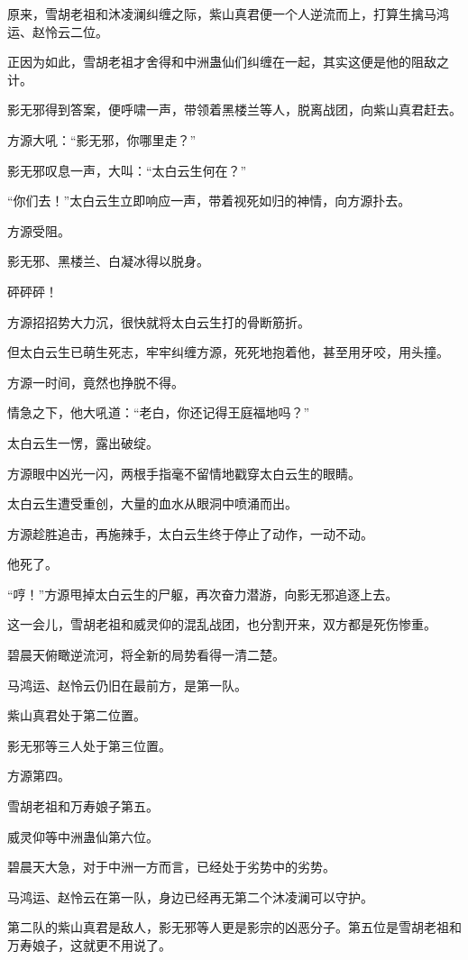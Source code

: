 \begin{this_body}
原来，雪胡老祖和沐凌澜纠缠之际，紫山真君便一个人逆流而上，打算生擒马鸿运、赵怜云二位。

正因为如此，雪胡老祖才舍得和中洲蛊仙们纠缠在一起，其实这便是他的阻敌之计。

影无邪得到答案，便呼啸一声，带领着黑楼兰等人，脱离战团，向紫山真君赶去。

方源大吼：“影无邪，你哪里走？”

影无邪叹息一声，大叫：“太白云生何在？”

“你们去！”太白云生立即响应一声，带着视死如归的神情，向方源扑去。

方源受阻。

影无邪、黑楼兰、白凝冰得以脱身。

砰砰砰！

方源招招势大力沉，很快就将太白云生打的骨断筋折。

但太白云生已萌生死志，牢牢纠缠方源，死死地抱着他，甚至用牙咬，用头撞。

方源一时间，竟然也挣脱不得。

情急之下，他大吼道：“老白，你还记得王庭福地吗？”

太白云生一愣，露出破绽。

方源眼中凶光一闪，两根手指毫不留情地戳穿太白云生的眼睛。

太白云生遭受重创，大量的血水从眼洞中喷涌而出。

方源趁胜追击，再施辣手，太白云生终于停止了动作，一动不动。

他死了。

“哼！”方源甩掉太白云生的尸躯，再次奋力潜游，向影无邪追逐上去。

这一会儿，雪胡老祖和威灵仰的混乱战团，也分割开来，双方都是死伤惨重。

碧晨天俯瞰逆流河，将全新的局势看得一清二楚。

马鸿运、赵怜云仍旧在最前方，是第一队。

紫山真君处于第二位置。

影无邪等三人处于第三位置。

方源第四。

雪胡老祖和万寿娘子第五。

威灵仰等中洲蛊仙第六位。

碧晨天大急，对于中洲一方而言，已经处于劣势中的劣势。

马鸿运、赵怜云在第一队，身边已经再无第二个沐凌澜可以守护。

第二队的紫山真君是敌人，影无邪等人更是影宗的凶恶分子。第五位是雪胡老祖和万寿娘子，这就更不用说了。


\end{this_body}

